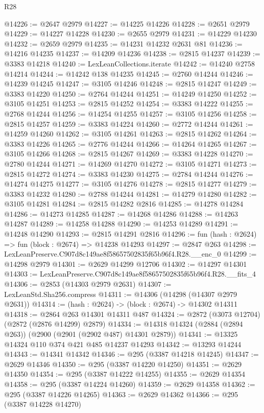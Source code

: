 \begin{lexlean}{R28}
\begin{coremodule}
@14226 := @2647 @2979
@14227 := @14225 @14226
@14228 := @2651 @2979
@14229 := @14227 @14228
@14230 := @2655 @2979
@14231 := @14229 @14230
@14232 := @2659 @2979
@14235 := @14231 @14232 @2631 @81
@14236 := @14216 @14235
@14237 := @14209 @14236
@14238 := @2815 @14237
@14239 := @3383 @14218
@14240 := LexLeanCollections.iterate
@14242 := @14240 @2758 @14214
@14244 := @14242 @138 @14235
@14245 := @2760 @14244
@14246 := @14239 @14245
@14247 := @3105 @14246
@14248 := @2815 @14247
@14249 := @3383 @14220
@14250 := @2764 @14244
@14251 := @14249 @14250
@14252 := @3105 @14251
@14253 := @2815 @14252
@14254 := @3383 @14222
@14255 := @2768 @14244
@14256 := @14254 @14255
@14257 := @3105 @14256
@14258 := @2815 @14257
@14259 := @3383 @14224
@14260 := @2772 @14244
@14261 := @14259 @14260
@14262 := @3105 @14261
@14263 := @2815 @14262
@14264 := @3383 @14226
@14265 := @2776 @14244
@14266 := @14264 @14265
@14267 := @3105 @14266
@14268 := @2815 @14267
@14269 := @3383 @14228
@14270 := @2780 @14244
@14271 := @14269 @14270
@14272 := @3105 @14271
@14273 := @2815 @14272
@14274 := @3383 @14230
@14275 := @2784 @14244
@14276 := @14274 @14275
@14277 := @3105 @14276
@14278 := @2815 @14277
@14279 := @3383 @14232
@14280 := @2788 @14244
@14281 := @14279 @14280
@14282 := @3105 @14281
@14284 := @2815 @14282 @2816
@14285 := @14278 @14284
@14286 := @14273 @14285
@14287 := @14268 @14286
@14288 := @14263 @14287
@14289 := @14258 @14288
@14290 := @14253 @14289
@14291 := @14248 @14290
@14293 := @2815 @14291 @2816
@14296 := fun (hash : @2624) => fun (block : @2674) => @14238 @14293
@14297 := @2847 @263
@14298 := LexLeanPreserve.C907d8c149ae8f58657502835f65b96f4.R28.__enc_0
@14299 := @14298 @2979
@14301 := @2629 @14299 @12706
@14302 := @14297 @14301
@14303 := LexLeanPreserve.C907d8c149ae8f58657502835f65b96f4.R28.__fits_4
@14306 := @2853 (@14303 @2979 @2631)
@14307 := LexLeanStd.Sha256.compress
@14311 := @14306 (@14298 (@14307 @2979 @2631))
@14314 := (hash : @2624) -> (block : @2674) -> @14302 @14311
@14318 := @2864 @263 @14301 @14311 @487
@14324 := @2872 (@3073 @12704) (@2872 (@2876 @14299) @2879)
@14334 := @14318 @14324 (@2884 (@2894 @263)) (@2900 (@2901 (@2902 @487) @14301 @2879))
@14341 := @13325 @14324 @110 @374 @421 @485 @14237 @14293
@14342 := @13293 @14244
@14343 := @14341 @14342
@14346 := @295 (@3387 @14218 @14245)
@14347 := @2629 @14346
@14350 := @295 (@3387 @14220 @14250)
@14351 := @2629 @14350
@14354 := @295 (@3387 @14222 @14255)
@14355 := @2629 @14354
@14358 := @295 (@3387 @14224 @14260)
@14359 := @2629 @14358
@14362 := @295 (@3387 @14226 @14265)
@14363 := @2629 @14362
@14366 := @295 (@3387 @14228 @14270)

\end{coremodule}
\end{lexlean}
